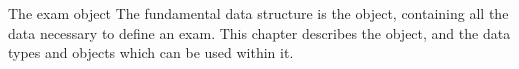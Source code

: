 %
%
%

\begin{chapter}{\label{cha:exam_object}The exam object}
  The fundamental data structure is the  object, containing
  all the data necessary to define an exam.  This chapter describes the  object, and the data types and objects which can be used
  within it.


\end{chapter}
